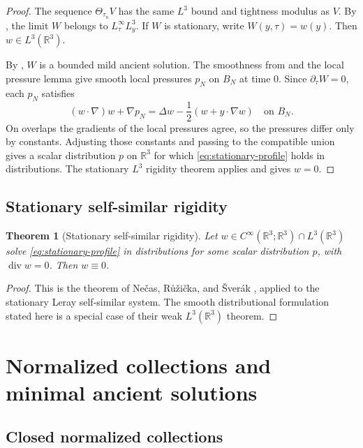 \documentclass[11pt]{amsart}
\theoremstyle{plain}
\newtheorem{theorem}{Theorem}[section]
\theoremstyle{definition}
\theoremstyle{remark}
\numberwithin{equation}{section}
\newcommand{\R}{\mathbb R}
\newcommand{\divergence}{\operatorname{div}}
\begin{document}
\begin{proof}
The sequence \(\Theta_{\tau_n}V\) has the same \(L^3\) bound and tightness
modulus as \(V\).  By , the limit \(W\) belongs to
\(L^\infty_\tau L^3_y\).  If \(W\) is stationary, write
\(W(y,\tau)=w(y)\).  Then \(w\in L^3(\R^3)\).

By , \(W\) is a bounded mild ancient solution.  The
smoothness from  and the local pressure lemma
 give smooth local pressures \(p_N\) on \(B_N\) at
time \(0\).  Since
\(\partial_\tau W=0\), each \(p_N\) satisfies
\[
   (w\cdot\nabla)w+\nabla p_N
   =
   \Delta w-\frac12(w+y\cdot\nabla w)
   \quad\text{on }B_N .
\]
On overlaps the gradients of the local pressures agree, so the pressures
differ only by constants.  Adjusting those constants and passing to the
compatible union gives a scalar distribution \(p\) on \(\R^3\) for which
\eqref{eq:stationary-profile} holds in distributions.  The stationary
\(L^3\) rigidity theorem  applies and gives \(w=0\).
\end{proof}

\subsection{Stationary self-similar rigidity}

\begin{theorem}[Stationary self-similar rigidity]\label{thm:NRS}
Let \(w\in C^\infty(\R^3;\R^3)\cap L^3(\R^3)\) solve
\eqref{eq:stationary-profile} in distributions for some scalar distribution
\(p\), with \(\divergence w=0\).  Then \(w\equiv0\).
\end{theorem}

\begin{proof}
This is the theorem of Ne\v{c}as, R\r{u}\v{z}i\v{c}ka, and
\v{S}ver\'ak \cite{NRS1996}, applied to the stationary Leray self-similar
system.  The smooth distributional formulation stated here is a special case
of their weak \(L^3(\R^3)\) theorem.
\end{proof}

\section{Normalized collections and minimal ancient solutions}
\label{sec:minimal-elements}

\subsection{Closed normalized collections}
\end{document}
